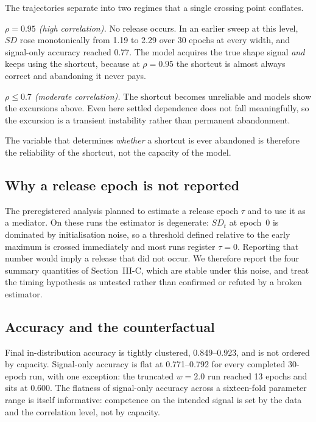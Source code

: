 \documentclass[conference]{IEEEtran}
\begin{document}
The trajectories separate into two regimes that a single crossing point conflates.

\textit{$\rho=0.95$ (high correlation).} No release occurs. In an earlier sweep at this
level, $SD$ rose monotonically from 1.19 to 2.29 over 30 epochs at every width, and
signal-only accuracy reached 0.77. The model acquires the true shape signal \emph{and}
keeps using the shortcut, because at $\rho{=}0.95$ the shortcut is almost always correct and
abandoning it never pays.

\textit{$\rho\le0.7$ (moderate correlation).} The shortcut becomes unreliable and models
show the excursions above. Even here settled dependence does not fall meaningfully, so the
excursion is a transient instability rather than permanent abandonment.

The variable that determines \emph{whether} a shortcut is ever abandoned is therefore the
reliability of the shortcut, not the capacity of the model.

\subsection{Why a release epoch is not reported}

The preregistered analysis planned to estimate a release epoch $\tau$ and to use it as a
mediator. On these runs the estimator is degenerate: $SD_t$ at epoch~0 is dominated by
initialisation noise, so a threshold defined relative to the early maximum is crossed
immediately and most runs register $\tau=0$. Reporting that number would imply a release
that did not occur. We therefore report the four summary quantities of
Section~III-C, which are stable under this noise, and treat the timing hypothesis as
untested rather than confirmed or refuted by a broken estimator.

\subsection{Accuracy and the counterfactual}

Final in-distribution accuracy is tightly clustered, 0.849--0.923, and is not ordered by
capacity. Signal-only accuracy is flat at 0.771--0.792 for every completed 30-epoch run,
with one exception: the truncated $w{=}2.0$ run reached 13 epochs and sits at 0.600. The
flatness of signal-only accuracy across a sixteen-fold parameter range is itself
informative: competence on the intended signal is set by the data and the correlation
level, not by capacity.
\end{document}

